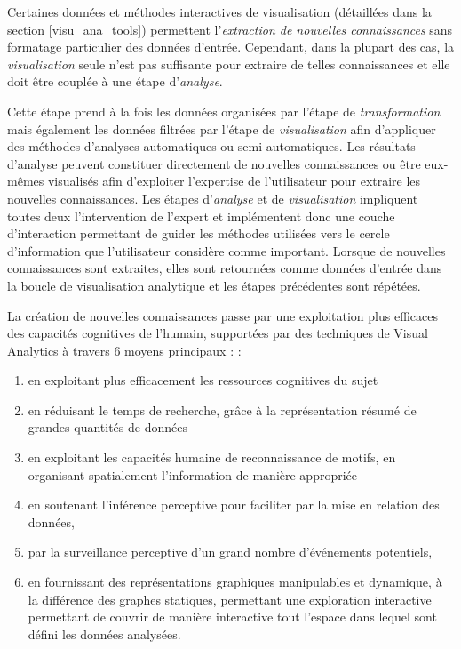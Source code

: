 
Certaines données et méthodes interactives de visualisation (détaillées dans la section \ref{visu_ana_tools}) permettent l'\textit{extraction de nouvelles connaissances} sans formatage particulier des données d'entrée. Cependant, dans la plupart des cas, la \textit{visualisation} seule n'est pas suffisante pour extraire de telles connaissances et elle doit être couplée à une étape d'\textit{analyse}. 

Cette étape prend à la fois les données organisées par l'étape de \textit{transformation} mais également les données filtrées par l'étape de \textit{visualisation} afin d'appliquer des méthodes d'analyses automatiques ou semi-automatiques. Les résultats d'analyse peuvent constituer directement de nouvelles connaissances ou être eux-mêmes visualisés afin d'exploiter l'expertise de l'utilisateur pour extraire les nouvelles connaissances. Les étapes d'\textit{analyse} et de \textit{visualisation} impliquent toutes deux l'intervention de l'expert et implémentent donc une couche d'interaction permettant de guider les méthodes utilisées vers le cercle d'information que l'utilisateur considère comme important. Lorsque de nouvelles connaissances sont extraites, elles sont retournées comme données d'entrée dans la  boucle de visualisation analytique et les étapes précédentes sont répétées.

La création de nouvelles connaissances passe par une exploitation plus efficaces des capacités cognitives de l'humain, supportées par des techniques de Visual Analytics à travers 6 moyens principaux :  \cite{card1999readings,cook_illuminating_2005} :

\begin{enumerate}
  \item en exploitant plus efficacement les ressources cognitives du sujet
  \item en réduisant le temps de recherche, grâce à la représentation résumé de grandes quantités de données 
  \item en exploitant les capacités humaine de reconnaissance de motifs, en organisant spatialement l'information de manière appropriée
  \item en soutenant l'inférence perceptive pour faciliter par la mise en relation des données, 
  \item par la surveillance perceptive d'un grand nombre d'événements potentiels, 
  \item en fournissant des représentations graphiques manipulables et dynamique, à la différence des graphes statiques, permettant une exploration interactive permettant de couvrir de manière interactive tout l'espace dans lequel sont défini les données analysées.
\end{enumerate}

